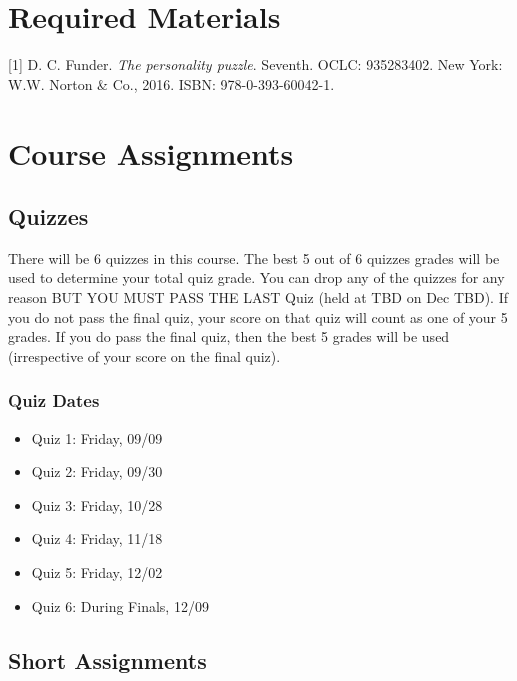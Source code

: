 \hypertarget{required-materials}{%
\section*{Required Materials}\label{required-materials}}


{[}1{]} D. C. Funder. \emph{The personality puzzle}. Seventh. OCLC: 935283402.
New York: W.W. Norton \& Co., 2016. ISBN: 978-0-393-60042-1.

\hypertarget{course-assignments}{%
\section*{Course Assignments}\label{course-assignments}}


\hypertarget{quizzes}{%
\subsection*{Quizzes}\label{quizzes}}


There will be 6 quizzes in this course. The best 5 out of 6 quizzes grades will be used to determine your total quiz grade. You can drop any of the quizzes for any reason BUT YOU MUST PASS THE LAST Quiz (held at TBD on Dec TBD). If you do not pass the final quiz, your score on that quiz will count as one of your 5 grades. If you do pass the final quiz, then the best 5 grades will be used (irrespective of your score on the final quiz).

\hypertarget{quiz-dates}{%
\subsubsection*{Quiz Dates}\label{quiz-dates}}


\begin{itemize}
\item
  Quiz 1: Friday, 09/09
\item
  Quiz 2: Friday, 09/30
\item
  Quiz 3: Friday, 10/28
\item
  Quiz 4: Friday, 11/18
\item
  Quiz 5: Friday, 12/02
\item
  Quiz 6: During Finals, 12/09
\end{itemize}

\hypertarget{short-assignments}{%
\subsection*{Short Assignments}\label{short-assignments}}


